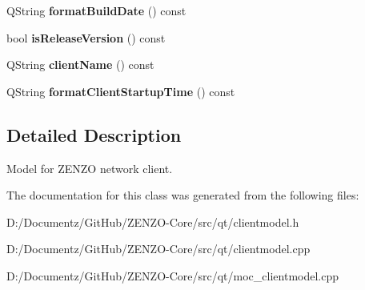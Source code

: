 \begin{DoxyCompactItemize}
\mbox{\label{class_client_model_a48d34d4832a0980e03cbc13e60338c37}} 
Q\+String {\bfseries format\+Build\+Date} () const
\item 
\mbox{\label{class_client_model_af8fdca28795abcf885ac4e78342ecccd}} 
bool {\bfseries is\+Release\+Version} () const
\item 
\mbox{\label{class_client_model_a3344257e3eccd1d123df143dd9f04a4c}} 
Q\+String {\bfseries client\+Name} () const
\item 
\mbox{\label{class_client_model_aae1793d38356a2e8040d9e7dc813b0c1}} 
Q\+String {\bfseries format\+Client\+Startup\+Time} () const
\end{DoxyCompactItemize}


\subsection{Detailed Description}
Model for Z\+E\+N\+ZO network client. 

The documentation for this class was generated from the following files\+:\begin{DoxyCompactItemize}
\item 
D\+:/\+Documentz/\+Git\+Hub/\+Z\+E\+N\+Z\+O-\/\+Core/src/qt/clientmodel.\+h\item 
D\+:/\+Documentz/\+Git\+Hub/\+Z\+E\+N\+Z\+O-\/\+Core/src/qt/clientmodel.\+cpp\item 
D\+:/\+Documentz/\+Git\+Hub/\+Z\+E\+N\+Z\+O-\/\+Core/src/qt/moc\+\_\+clientmodel.\+cpp\end{DoxyCompactItemize}

